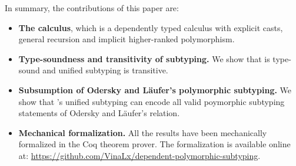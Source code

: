 In summary, the contributions of this paper are:

\begin{itemize}

\item {\bf The \name calculus}, which is a dependently typed calculus with explicit casts,
  general recursion and implicit higher-ranked polymorphism.

\item {\bf Type-soundness and transitivity of subtyping.} We show that \name
  is type-sound and unified subtyping is transitive.

\item {\bf Subsumption of Odersky and L\"aufer's polymorphic subtyping.} We show that \name's
  unified subtyping can encode all valid poymorphic subtyping statements of Odersky and L\"aufer's
  relation.

\item {\bf Mechanical formalization.} All the results have been mechanically
  formalized in the Coq theorem prover. The formalization is available online at:
  \url{https://github.com/VinaLx/dependent-polymorphic-subtyping}.

\end{itemize}
